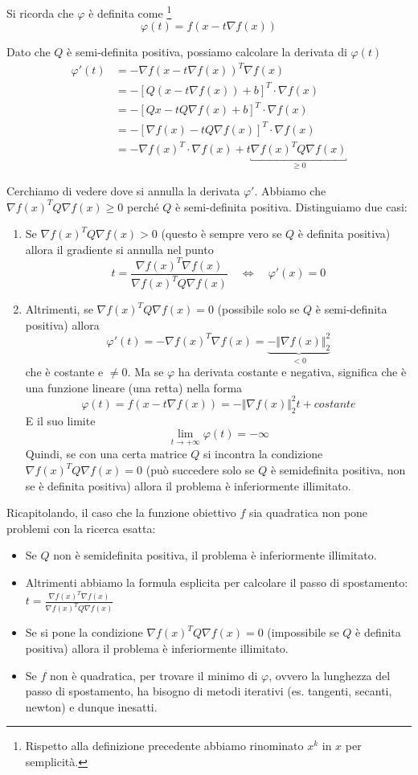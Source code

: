 Si ricorda che $\varphi$ \`e definita come \footnote{Rispetto alla
definizione precedente abbiamo rinominato $x^k$ in $x$ per
semplicit\`a.}
$$\varphi(t) = f(x -t \nabla f(x))$$

Dato che $Q$ \`e semi-definita positiva, possiamo calcolare la
derivata di $\varphi(t)$
$$
\begin{array}{rl} \varphi'(t) &= -\nabla f(x -t \nabla f(x))^{T}
\nabla f(x) \\ &= -[Q(x -t \nabla f(x)) + b]^{T} \cdot \nabla f(x) \\
&= -[Qx -t Q \nabla f(x) + b]^{T} \cdot \nabla f(x) \\ &= -[\nabla
f(x) -t Q \nabla f(x)]^{T} \cdot \nabla f(x) \\ &= -\nabla f(x)^{T}
\cdot \nabla f(x) + t \underbracket{\nabla f(x)^{T} Q \nabla
f(x)}_{\geq 0}
\end{array}
$$

Cerchiamo di vedere dove si annulla la derivata $\varphi'$. Abbiamo
che $\nabla f(x)^{T} Q \nabla f(x) \geq 0 $ perch\'e $Q$ \`e semi-definita
positiva. Distinguiamo due casi:
\begin{enumerate}
\item Se $\nabla f(x)^{T} Q \nabla f(x) >0$ (questo \`e sempre vero se
$Q$ \`e definita positiva) allora il gradiente si annulla nel punto
$$ t= \frac{\nabla f(x)^{T} \nabla f(x)}{\nabla f(x)^{T}Q \nabla f(x)} \quad \Longleftrightarrow \quad \varphi'(x) = 0$$
\item Altrimenti, se $\nabla f(x)^{T} Q \nabla f(x) =0$ (possibile
solo se $Q$ \`e semi-definita positiva) allora
$$ \varphi'(t) = -\nabla f(x)^{T} \nabla f(x)  = \underbrace{-\Vert \nabla f(x)\Vert_{2}^{2}}_{<0}$$
che \`e costante e $\neq 0$. Ma se $\varphi$ ha derivata costante e
negativa, significa che \`e una funzione lineare (una retta) nella forma
$$\varphi(t) = f(x-t \nabla f(x)) = - \Vert \nabla f(x)\Vert_{2}^{2} t + costante$$
E il suo limite
$$ \lim_{t \to +\infty}{\varphi(t)}  = - \infty$$
Quindi, se con una certa matrice $Q$ si incontra la condizione $\nabla
f(x)^{T} Q \nabla f(x) =0$ (può succedere solo se $Q$ \`e semidefinita
positiva, non se \`e definita positiva) allora il problema \`e
inferiormente illimitato.
\end{enumerate}

Ricapitolando, il caso che la funzione obiettivo $f$ sia quadratica
non pone problemi con la ricerca esatta:
\begin{itemize}
\item Se $Q$ non \`e semidefinita positiva, il problema \`e inferiormente
illimitato.
\item Altrimenti abbiamo la formula esplicita per calcolare il passo
di spostamento: $t= \frac{\nabla f(x)^{T} \nabla f(x)}{\nabla f(x)^{T}Q \nabla f(x)}$
\item Se si pone la condizione $\nabla f(x)^{T} Q \nabla f(x) =0$
(impossibile se $Q$ \`e definita positiva) allora il problema \`e
inferiormente illimitato.
\item Se $f$ non \`e quadratica, per trovare il minimo di $\varphi$,
ovvero la lunghezza del passo di spostamento, ha bisogno di metodi
iterativi (es. tangenti, secanti, newton) e dunque inesatti.
\end{itemize}

